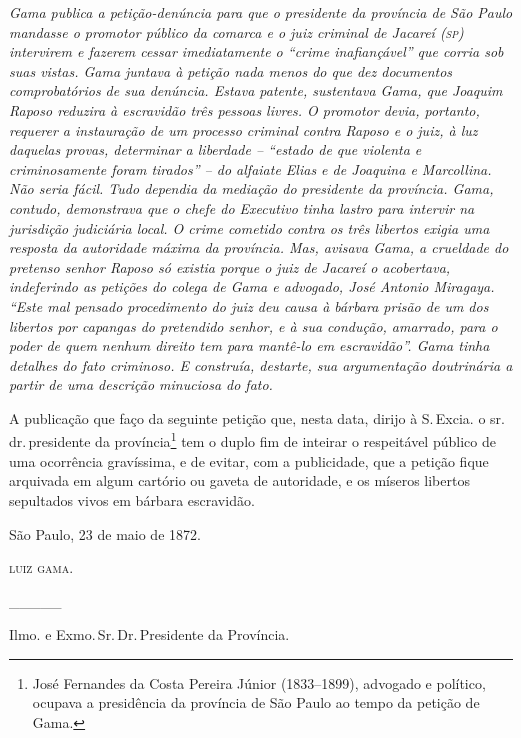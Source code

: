 \begin{didascalia}
\emph{Gama publica a petição-denúncia para que o presidente da província
de São Paulo mandasse o promotor público da comarca e o juiz criminal de
Jacareí (\textsc{sp}) intervirem e fazerem cessar imediatamente o ``crime
inafiançável'' que corria sob suas vistas. Gama juntava à petição nada
menos do que dez documentos comprobatórios de sua denúncia. Estava
patente, sustentava Gama, que Joaquim Raposo reduzira à escravidão três
pessoas livres. O promotor devia, portanto, requerer a instauração de um
processo criminal contra Raposo e o juiz, à luz daquelas provas,
determinar a liberdade -- ``estado de que violenta e criminosamente foram
tirados'' -- do alfaiate Elias e de Joaquina e Marcollina. Não seria
fácil. Tudo dependia da mediação do presidente da província. Gama,
contudo, demonstrava que o chefe do Executivo tinha lastro para intervir
na jurisdição judiciária local. O crime cometido contra os três libertos
exigia uma resposta da autoridade máxima da província. Mas, avisava
Gama, a crueldade do pretenso senhor Raposo só existia porque o juiz de
Jacareí o acobertava, indeferindo as petições do colega de Gama e
advogado, José Antonio Miragaya. ``Este mal pensado procedimento do juiz
deu causa à bárbara prisão de um dos libertos por capangas do pretendido
senhor, e à sua condução, amarrado, para o poder de quem nenhum direito
tem para mantê-lo em escravidão''. Gama tinha detalhes do fato criminoso.
E construía, destarte, sua argumentação doutrinária a partir de uma
descrição minuciosa do fato.}
\end{didascalia}

A publicação que faço da seguinte petição que, nesta data, dirijo à S.\,Excia. o sr.\,dr.\,presidente da província\footnote{ José Fernandes da
  Costa Pereira Júnior (1833--1899), advogado e político, ocupava a
  presidência da província de São Paulo ao tempo da petição de Gama.}
tem o duplo fim de inteirar o respeitável público de uma ocorrência
gravíssima, e de evitar, com a publicidade, que a petição fique
arquivada em algum cartório ou gaveta de autoridade, e os míseros
libertos sepultados vivos em bárbara escravidão.

São Paulo, 23 de maio de 1872.

\textsc{luiz gama}.

\_\_\_\_\_

Ilmo. e Exmo.\,Sr.\,Dr.\,Presidente da Província.

